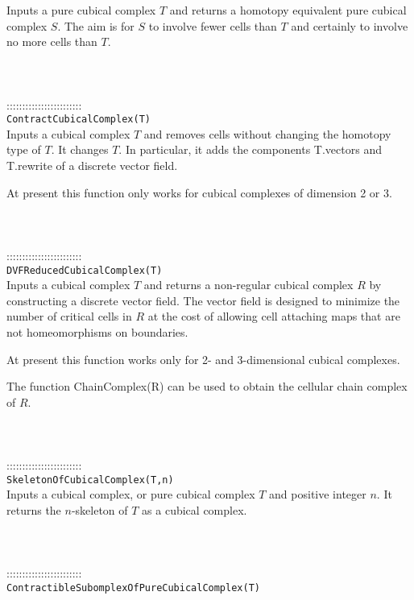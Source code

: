 \documentclass[a4paper,11pt]{report}
\begin{document}
{ Inputs a pure cubical complex $T$ and returns a homotopy equivalent pure cubical complex $S$. The aim is for $S$ to involve fewer cells than $T$ and certainly to involve no more cells than $T$. \\
 \\
 \\
 \\
 ::::::::::::::::::::::::\\
 \texttt{ContractCubicalComplex(T)}\\
 

 Inputs a cubical complex $T$ and removes cells without changing the homotopy type of $T$. It changes $T$. In particular, it adds the components T.vectors and T.rewrite of a discrete
vector field. 

 At present this function only works for cubical complexes of dimension 2 or 3. \\
 \\
 \\
 \\
 ::::::::::::::::::::::::\\
 \texttt{DVFReducedCubicalComplex(T)}\\
 

 Inputs a cubical complex $T$ and returns a non-regular cubical complex $R$ by constructing a discrete vector field. The vector field is designed to
minimize the number of critical cells in $R$ at the cost of allowing cell attaching maps that are not homeomorphisms on
boundaries. 

 At present this function works only for 2- and 3-dimensional cubical
complexes. 

 The function ChainComplex(R) can be used to obtain the cellular chain complex
of $R$. \\
 \\
 \\
 \\
 ::::::::::::::::::::::::\\
 \texttt{SkeletonOfCubicalComplex(T,n)}\\
 

 Inputs a cubical complex, or pure cubical complex $T$ and positive integer $n$. It returns the $n$-skeleton of $T$ as a cubical complex. \\
 \\
 \\
 \\
 ::::::::::::::::::::::::\\
 \texttt{ContractibleSubomplexOfPureCubicalComplex(T)}\\
 

}
\end{document}
